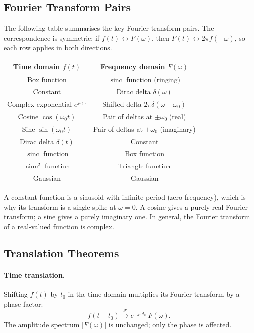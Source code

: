\documentclass{article}
\begin{document}
\subsection{Fourier Transform Pairs}

The following table summarises the key Fourier transform pairs. The correspondence is symmetric: if $f(t) \leftrightarrow F(\omega)$, then $F(t) \leftrightarrow 2\pi f(-\omega)$, so each row applies in both directions.

\begin{center}
{\renewcommand{\arraystretch}{1.3}
\begin{tabular}{|c|c|}
    \hline
    \textbf{Time domain} $f(t)$ & \textbf{Frequency domain} $F(\omega)$ \\
    \hline
    Box function & $\operatorname{sinc}$ function (ringing) \\
    \hline
    Constant & Dirac delta $\delta(\omega)$ \\
    \hline
    Complex exponential $e^{j\omega_0 t}$ & Shifted delta $2\pi\delta(\omega - \omega_0)$ \\
    \hline
    Cosine $\cos(\omega_0 t)$ & Pair of deltas at $\pm\omega_0$ (real) \\
    \hline
    Sine $\sin(\omega_0 t)$ & Pair of deltas at $\pm\omega_0$ (imaginary) \\
    \hline
    Dirac delta $\delta(t)$ & Constant \\
    \hline
    $\operatorname{sinc}$ function & Box function \\
    \hline
    $\operatorname{sinc}^2$ function & Triangle function \\
    \hline
    Gaussian & Gaussian \\
    \hline
\end{tabular}}
\end{center}

A constant function is a sinusoid with infinite period (zero frequency), which is why its transform is a single spike at $\omega = 0$. A cosine gives a purely real Fourier transform; a sine gives a purely imaginary one. In general, the Fourier transform of a real-valued function is complex.

\subsection{Translation Theorems}

\paragraph{Time translation.}
Shifting $f(t)$ by $t_0$ in the time domain multiplies its Fourier transform by a phase factor:
\[f(t - t_0) \xrightarrow{\mathcal{F}} e^{-j\omega t_0}\,F(\omega).\]
The amplitude spectrum $|F(\omega)|$ is unchanged; only the phase is affected.
\end{document}
